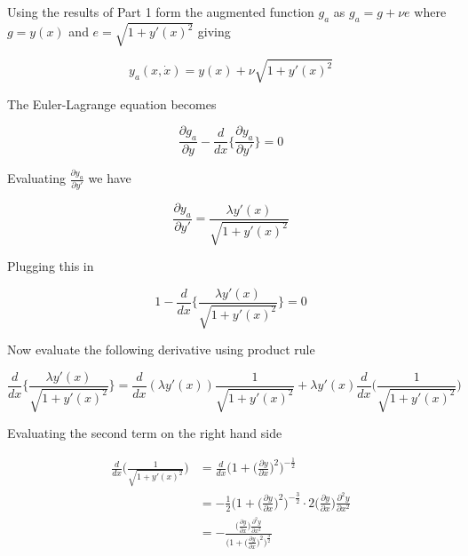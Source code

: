 \documentclass[11pt,letterpaper,onecolumn,notitlepage]{article}
\begin{document}
  Using the results of Part 1 form the augmented function $g_{a}$ as $g_{a}=g+\nu e$ where $g=y(x)$ and $e=\sqrt{1+y'(x)^{2}}$ giving

  \begin{equation*}
    y_{a}(x,\dot{x})=y(x)+\nu\sqrt{1+y'(x)^{2}}
  \end{equation*}

  The Euler-Lagrange equation becomes

  \begin{equation*}
    \frac{\partial{}g_{a}}{\partial{}y}-\frac{d}{dx}\bigg\{\frac{\partial{}y_{a}}{\partial{}y'}\biggr\}=0
  \end{equation*}

  Evaluating $\frac{\partial{}y_{a}}{\partial{}y'}$ we have

  \begin{equation*}
    \frac{\partial{}y_{a}}{\partial{}y'}=
    \frac{\lambda y'(x)}{\sqrt{1+y'(x)^{2}}}
  \end{equation*}

  Plugging this in

  \begin{equation*}
    1-\frac{d}{dx}\bigg\{\frac{\lambda y'(x)}{\sqrt{1+y'(x)^{2}}}\biggr\}=0
  \end{equation*}

  Now evaluate the following derivative using product rule

  \begin{equation*}
    \frac{d}{dx}\bigg\{\frac{\lambda y'(x)}{\sqrt{1+y'(x)^{2}}}\biggr\}=
    \frac{d}{dx}(\lambda y'(x))\frac{1}{\sqrt{1+y'(x)^{2}}}+
    \lambda y'(x)\frac{d}{dx}\biggr(\frac{1}{\sqrt{1+y'(x)^{2}}}\biggr)
  \end{equation*}

  Evaluating the second term on the right hand side

  \begin{align*}
    \frac{d}{dx}\biggr(\frac{1}{\sqrt{1+y'(x)^{2}}}\biggr)&=
    \frac{d}{dx}\biggr(1+\biggr(\frac{\partial{}y}{\partial{}x}\biggr)^{2}\biggr)^{-\frac{1}{2}} \\
    &=-\frac{1}{2}\biggr(1+\biggr(\frac{\partial{}y}{\partial{}x}\biggr)^{2}\biggr)^{-\frac{3}{2}}\cdot 2\biggr(\frac{\partial{}y}{\partial{}x}\biggr)\frac{\partial^{2}y}{\partial{}x^{2}} \\
    &=-\frac{\bigr(\frac{\partial{}y}{\partial{}x}\bigr)\frac{\partial^{2}y}{\partial{}x^{2}}}{\bigr(1+\bigr(\frac{\partial{}y}{\partial{}x}\bigr)^{2}\bigr)^{\frac{3}{2}}}
  \end{align*}
\end{document}
